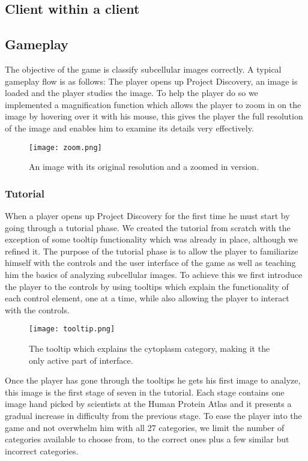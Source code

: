 \subsection{Client within a client}

\subsection{Gameplay}
	The objective of the game is classify subcellular images correctly. A typical gameplay flow is as follows: The player opens up Project Discovery, an image is loaded and the player studies the image. To help the player do so we implemented a magnification function which allows the player to zoom in on the image by hovering over it with his mouse, this gives the player the full resolution of the image and enables him to examine its details very effectively.

	\begin{figure}[H]
	  \centering
	  \graphicspath{ {./graphics/} }
	  \centerline{\texttt{[image: zoom.png]}}
	  \caption{\label{fig:zoom}An image with its original resolution and a zoomed in version.}
	\end{figure} 

	\subsubsection{Tutorial}
		When a player opens up Project Discovery for the first time he must start by going through a tutorial phase. We created the tutorial from scratch with the exception of some tooltip functionality which was already in place, although we refined it. The purpose of the tutorial phase is to allow the player to familiarize himself with the controls and the user interface of the game as well as teaching him the basics of analyzing subcellular images. To achieve this we first introduce the player to the controls by using tooltips which explain the functionality of each control element, one at a time, while also allowing the player to interact with the controls. 

		\begin{figure}[H]
		  \centering
		  \graphicspath{ {./graphics/} }
		  \centerline{\texttt{[image: tooltip.png]}}
		  \caption{\label{fig:tooltip}The tooltip which explains the cytoplasm category, making it the only active part of interface.}
		\end{figure}

		Once the player has gone through the tooltips he gets his first image to analyze, this image is the first stage of seven in the tutorial. Each stage contains one image hand picked by scientists at the Human Protein Atlas and it presents a gradual increase in difficulty from the previous stage. To ease the player into the game and not overwhelm him with all 27 categories, we limit the number of categories available to choose from, to the correct ones plus a few similar but incorrect categories.

